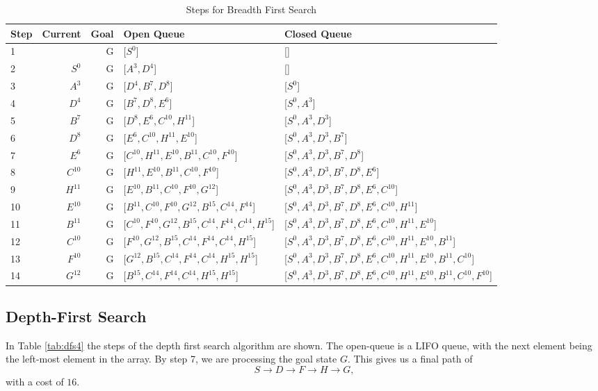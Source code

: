 \documentclass{article}
\begin{document}
    \begin{table}[!htp]\centering
        \caption{Steps for Breadth First Search}\label{tab:bfs4}
        \scriptsize
        \begin{tabular}{lrrll}\toprule
        Step &Current &Goal & Open Queue &Closed Queue  \\\midrule
        1&  &G &[$S^0$] &[] \\
        2& $S^0$ &G &[$A^3, D^4$] &[] \\
        3& $A^3$ &G &[$D^4, B^7, D^8$] &[$S^0$] \\
        4& $D^4$ &G &[$B^7, D^8, E^6$] &[$S^0, A^3$] \\
        5& $B^7$ &G &[$D^8, E^6, C^{10}, H^{11}$] &[$S^0, A^3, D^3$] \\
        6& $D^8$ &G &[$E^6, C^{10}, H^{11}, E^{10}$] &[$S^0, A^3, D^3, B^7$] \\
        7& $E^6$ &G &[$C^{10}, H^{11}, E^{10}, B^{11}, C^{10}, F^{10}$] &[$S^0, A^3, D^3, B^7, D^{8}$] \\
        8& $C^{10}$ &G &[$H^{11}, E^{10}, B^{11}, C^{10}, F^{10}$] &[$S^0, A^3, D^3, B^7, D^{8}, E^{6}$] \\
        9& $H^{11}$ &G &[$E^{10}, B^{11}, C^{10}, F^{10}, G^{12}$] &[$S^0, A^3, D^3, B^7, D^{8}, E^{6}, C^{10}$] \\
        10& $E^{10}$ &G &[$B^{11}, C^{10}, F^{10}, G^{12}, B^{15}, C^{14}, F^{14}$] &[$S^0, A^3, D^3, B^7, D^{8}, E^{6}, C^{10}, H^{11}$] \\
        11& $B^{11}$ &G &[$C^{10}, F^{10}, G^{12}, B^{15}, C^{14}, F^{14}, C^{14}, H^{15}$] &[$S^0, A^3, D^3, B^7, D^{8}, E^{6}, C^{10}, H^{11}, E^{10}$] \\
        12& $C^{10}$ &G &[$F^{10}, G^{12}, B^{15}, C^{14}, F^{14}, C^{14}, H^{15}$] &[$S^0, A^3, D^3, B^7, D^{8}, E^{6}, C^{10}, H^{11}, E^{10}, B^{11}$] \\
        13& $F^{10}$ &G &[$G^{12}, B^{15}, C^{14}, F^{14}, C^{14}, H^{15}, H^{15}$] &[$S^0, A^3, D^3, B^7, D^{8}, E^{6}, C^{10}, H^{11}, E^{10}, B^{11}, C^{10}$] \\
        14& $G^{12}$ &G &[$B^{15}, C^{14}, F^{14}, C^{14}, H^{15}, H^{15}$] &[$S^0, A^3, D^3, B^7, D^{8}, E^{6}, C^{10}, H^{11}, E^{10}, B^{11}, C^{10}, F^{10}$] \\
        \bottomrule
        \end{tabular}
    \end{table}
\subsection{Depth-First Search}
    In Table \ref{tab:dfs4} the steps of the depth first search algorithm are shown. The open-queue is a LIFO queue, with the next element being the left-most element in the array. 
    By step 7, we are processing the goal state $G$. This gives us a final path of
    \begin{equation}
        S \rightarrow D \rightarrow F \rightarrow H \rightarrow G,
    \end{equation}
    with a cost of $16$.
\end{document}
